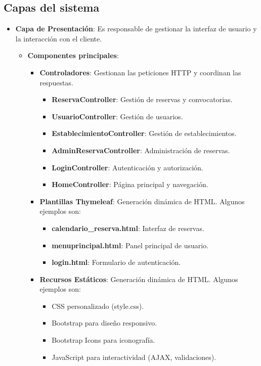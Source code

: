 \subsection{Capas del sistema}
\begin{itemize}
	\item \textbf{Capa de Presentación}: Es responsable de gestionar la interfaz de usuario y la interacción con el cliente.
	\begin{itemize}
       \item \textbf{Componentes principales}: 
       	\begin{itemize}
               \item \textbf{Controladores}: Gestionan las peticiones HTTP y coordinan las respuestas.
           	\begin{itemize}
                   \item \textbf{ReservaController}: Gestión de reservas y convocatorias.
                   \item \textbf{UsuarioController}: Gestión de usuarios.
                   \item \textbf{EstablecimientoController}: Gestión de establecimientos.
                   \item \textbf{AdminReservaController}: Administración de reservas.
                   \item \textbf{LoginController}: Autenticación y autorización.
                   \item \textbf{HomeController}: Página principal y navegación.
                \end{itemize}

               \item \textbf{Plantillas Thymeleaf}: Generación dinámica de HTML. Algunos ejemplos son:
               \begin{itemize}
                  \item \textbf{calendario\_reserva.html}: Interfaz de reservas.
                  \item \textbf{menuprincipal.html}: Panel principal de usuario.
                  \item \textbf{login.html}: Formulario de autenticación.
               \end{itemize}

               \item \textbf{Recursos Estáticos}: Generación dinámica de HTML. Algunos ejemplos son:
               \begin{itemize}
                  \item CSS personalizado (style.css).
                  \item Bootstrap para diseño responsivo.
                  \item Bootstrap Icons para iconografía.
                  \item JavaScript para interactividad (AJAX, validaciones).
               \end{itemize}


\end{itemize}
\end{itemize}
\end{itemize}

